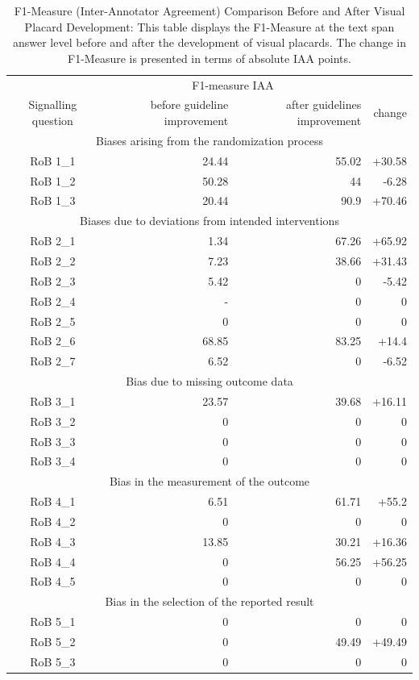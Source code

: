 \documentclass[sn-mathphys,Numbered]{sn-jnl}%
\theoremstyle{thmstyleone}%
\theoremstyle{thmstyletwo}%
\theoremstyle{thmstylethree}%
\begin{document}
\begin{table}[htb]
    \caption{F1-Measure (Inter-Annotator Agreement) Comparison Before and After Visual Placard Development: This table displays the F1-Measure at the text span answer level before and after the development of visual placards. The change in F1-Measure is presented in terms of absolute IAA points.}
    \label{tab:IAA_sq}
    \centering
    \begin{tabular}{crrr}
    \toprule[1.0pt]
         & \multicolumn{2}{c}{F1-measure IAA} & \\
        Signalling question & before guideline improvement & after guidelines improvement & change \\
    \midrule[1.0pt]
        \multicolumn{4}{c}{Biases arising from the randomization process} \\
        \hline
        RoB 1\_1 & 24.44 & 55.02 & +30.58 \\ 
        RoB 1\_2 & 50.28 & 44 & -6.28 \\ 
        RoB 1\_3 & 20.44 & 90.9 & +70.46 \\
        \hline
        \multicolumn{4}{c}{Biases due to deviations from intended interventions} \\
        \hline
        RoB 2\_1 & 1.34 & 67.26 & +65.92 \\ 
        RoB 2\_2 & 7.23 & 38.66 & +31.43 \\ 
        RoB 2\_3 & 5.42 & 0 & -5.42 \\ 
        RoB 2\_4 & - & 0 & 0 \\ 
        RoB 2\_5 & 0 & 0 & 0 \\ 
        RoB 2\_6 & 68.85 & 83.25 & +14.4 \\ 
        RoB 2\_7 & 6.52 & 0 & -6.52 \\ 
        \hline
        \multicolumn{4}{c}{Bias due to missing outcome data} \\
        \hline
        RoB 3\_1 & 23.57 & 39.68 & +16.11 \\ 
        RoB 3\_2 & 0 & 0 & 0 \\ 
        RoB 3\_3 & 0 & 0 & 0 \\ 
        RoB 3\_4 & 0 & 0 & 0 \\ 
        \hline
        \multicolumn{4}{c}{Bias in the measurement of the outcome} \\
        \hline
        RoB 4\_1 & 6.51 & 61.71 & +55.2 \\ 
        RoB 4\_2 & 0 & 0 & 0 \\ 
        RoB 4\_3 & 13.85 & 30.21 & +16.36 \\ 
        RoB 4\_4 & 0 & 56.25 & +56.25 \\ 
        RoB 4\_5 & 0 & 0 & 0 \\ 
        \hline
        \multicolumn{4}{c}{Bias in the selection of the reported result} \\
        \hline
        RoB 5\_1 & 0 & 0 & 0 \\ 
        RoB 5\_2 & 0 & 49.49 & +49.49 \\ 
        RoB 5\_3 & 0 & 0 & 0 \\
    \bottomrule[1.0pt]
    \end{tabular}
\end{table}
%
%
%
\end{document}
